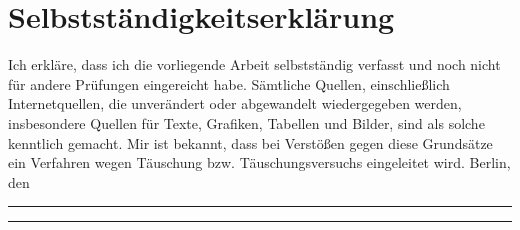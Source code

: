 



\tableofcontents*{}

\mainmatter










\backmatter

\pagebreak

\chapter*{Selbstständigkeitserklärung}
Ich erkläre, dass ich die vorliegende Arbeit selbstständig verfasst und noch nicht für
andere Prüfungen eingereicht habe. Sämtliche Quellen, einschließlich Internetquellen, die unverändert oder
abgewandelt wiedergegeben werden, insbesondere Quellen für Texte, Grafiken, Tabellen und
Bilder, sind als solche kenntlich gemacht. Mir ist bekannt, dass bei Verstößen gegen diese
Grundsätze ein Verfahren wegen Täuschung bzw. Täuschungsversuchs eingeleitet wird.
\bigbreak
Berlin, den \parbox[t]{.2\linewidth}{\rule[-3pt]{\linewidth}{.4pt}} \hfill \parbox[t]{.3\linewidth}{\rule[-3pt]{\linewidth}{.4pt}}




